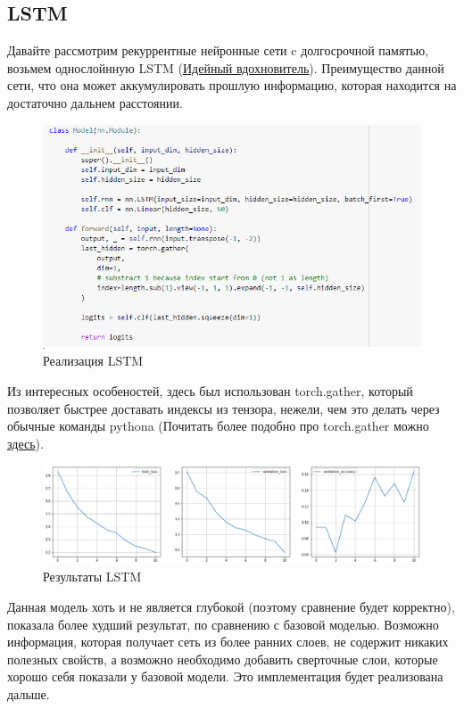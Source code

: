 \documentclass[a4paper,12pt]{article}
\begin{document}
 	\subsection{LSTM}
 	Давайте рассмотрим рекуррентные нейронные сети c долгосрочной памятью, возьмем однослойнную LSTM (\href{https://medium.com/@premtibadiya/music-genre-classification-using-rnn-lstm-1c212ba21e06}{Идейный вдохновитель}). Преимущество данной сети, что она может аккумулировать прошлую информацию, которая  находится на достаточно дальнем расстоянии. 
 	\begin{figure}[H]
 		\centering
 		\includegraphics[width=0.7\linewidth]{Image/Featurizer1}
 		\caption{Реализация LSTM}
 		\label{fig:featurizer1}
 	\end{figure}
	
	Из интересных особеностей, здесь был использован torch.gather, который позволяет быстрее доставать индексы из тензора, нежели, чем это делать через обычные команды pythona (Почитать более подобно про torch.gather можно \href{https://medium.com/@mbednarski/understanding-indexing-with-pytorch-gather-33717a84ebc4}{здесь}).
 
 
 	\begin{figure}[H]
 	\centering
 	\includegraphics[width=1\linewidth]{Image/LSTM_train.png}
 	\caption{Результаты LSTM}
 	\label{fig:featurizer1}
 \end{figure}
	Данная модель хоть и не является глубокой (поэтому сравнение будет корректно), показала более худший результат, по сравнению с базовой моделью. Возможно информация, которая получает сеть из более ранних слоев, не содержит никаких полезных свойств, а возможно необходимо добавить сверточные слои, которые хорошо себя показали у базовой модели. Это имплементация будет реализована дальше.
\end{document}
